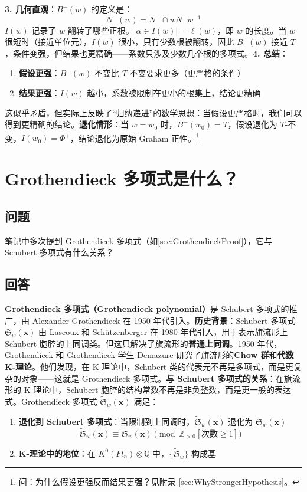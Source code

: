 \textbf{3. 几何直观}：$B^-(w)$ 的定义是：$$N^-(w) = N^- \cap wN^-w^{-1}$$$I(w)$ 记录了 $w$ 翻转了哪些正根。$|\alpha \in I(w)| = \ell(w)$，即 $w$ 的长度。当 $w$ 很短时（接近单位元），$I(w)$ 很小，只有少数根被翻转，因此 $B^-(w)$ 接近 $T$，条件变强，但结果也更精确——系数只涉及少数几个根的多项式。\textbf{4. 总结}：
\begin{enumerate}
\item \textbf{假设更强}：$B^-(w)$-不变比 $T$-不变要求更多（更严格的条件）\item \textbf{结果更强}：$I(w)$ 越小，系数被限制在更小的根集上，结论更精确
\end{enumerate}这似乎矛盾，但实际上反映了``归纳递进''的数学思想：当假设更严格时，我们可以得到更精确的结论。\textbf{退化情形}：当 $w = w_0$ 时，$B^-(w_0) = T$，假设退化为 $T$-不变，$I(w_0) = \Phi^+$，结论退化为原始 Graham 正性。\footnote{问：为什么假设更强反而结果更强？见附录 \cref{sec:WhyStrongerHypothesis}。}
\section{Grothendieck 多项式是什么？}\label{sec:GrothendieckPolynomial}
\subsection{问题}
\begin{sloppypar}
笔记中多次提到 Grothendieck 多项式（如\cref{sec:GrothendieckProof}），它与 Schubert 多项式有什么关系？
\end{sloppypar}
\subsection{回答}
\textbf{Grothendieck 多项式（Grothendieck polynomial）}是 Schubert 多项式的推广，由 Alexander Grothendieck 在 1950 年代引入。\textbf{历史背景}：Schubert 多项式 $\mathfrak{S}_w(\mathbf{x})$ 由 Lascoux 和 Schützenberger 在 1980 年代引入，用于表示旗流形上 Schubert 胞腔的上同调类。但这只解决了旗流形的\textbf{普通上同调}。1950 年代，Grothendieck 和 Grothendieck 学生 Demazure 研究了旗流形的\textbf{Chow 群}和\textbf{代数 K-理论}。他们发现，在 K-理论中，Schubert 类的代表元不再是多项式，而是更复杂的对象——这就是 Grothendieck 多项式。\textbf{与 Schubert 多项式的关系}：在旗流形的 K-理论中，Schubert 胞腔的结构常数不再是非负整数，而是更一般的表达式。Grothendieck 多项式 $\widetilde{\mathfrak{S}}_w(\mathbf{x})$ 满足：
\begin{enumerate}
\item \textbf{退化到 Schubert 多项式}：当限制到上同调时，$\widetilde{\mathfrak{S}}_w(\mathbf{x})$ 退化为 $\mathfrak{S}_w(\mathbf{x})$$$\widetilde{\mathfrak{S}}_w(\mathbf{x}) \equiv \mathfrak{S}_w(\mathbf{x}) \pmod{\mathbb{Z}_{>0}[\text{次数} \geq 1]}$$\item \textbf{K-理论中的地位}：在 $K^0(Fl_n) \otimes \mathbb{Q}$ 中，$\{\widetilde{\mathfrak{S}}_w\}$ 构成基
\end{enumerate}

